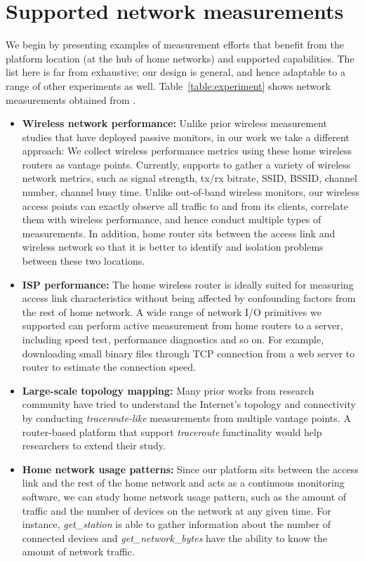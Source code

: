 \section{Supported network measurements}
\label{sec.network_measurement}
We begin by presenting examples of measurement efforts that benefit from the platform location (at the hub of home networks) and supported capabilities. The list here is far from exhaustive; our design is general, and hence adaptable to a range of other experiments as well. Table~\ref{table:experiment} shows network measurements obtained from \sysname.

\begin{itemize}
\item \textbf{Wireless network performance:} Unlike prior wireless measurement studies that have deployed passive monitors\cite{mahajan2006analyzing}\cite{raghavendra2009wi}\cite{papagiannaki2006experimental}, in our work we take a different approach: We collect wireless performance metrics using these home wireless routers as vantage points. Currently, \sysname supports to gather a variety of wireless network metrics, such as signal strength, tx/rx bitrate, SSID, BSSID, channel number, channel busy time.  Unlike out-of-band wireless monitors, our wireless access points can exactly observe all traffic to and from its clients, correlate them with wireless performance, and hence conduct multiple types of measurements. In addition, home router sits between the access link and wireless network so that it is better to identify and isolation problems between these two locations.

\item \textbf{ISP performance:} The home wireless router is ideally suited for measuring access link characteristics without being affected by confounding factors from the rest of home network. A wide range of network I/O primitives we supported can perform active measurement from home routers to a server, including speed test, performance diagnostics and so on. For example, downloading small binary files through TCP connection from a web server to router to estimate the connection speed.

\item \textbf{Large-scale topology mapping:} Many prior works from research community have tried to understand the Internet's topology and connectivity by conducting \textit{traceroute-like} measurements from multiple vantage points.\cite{paxson1996end}\cite{chen2009sidewalk} A router-based platform that support \textit{traceroute} functinality would help researchers to extend their study.

\item \textbf{Home network usage patterns:} Since our platform sits between the access link and the rest of the home network and acts as a continuous monitoring software, we can study home network usage pattern, such as the amount of traffic and the number of devices on the network at any given time. For instance, \textit{get\_station} is able to gather information about the number of connected devices and \textit{get\_network\_bytes} have the ability to know the amount of network traffic.    
\end{itemize} 

